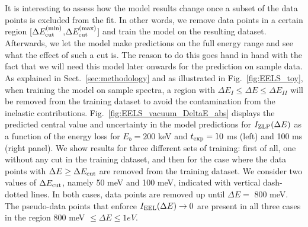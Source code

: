 It is interesting to assess how the model results change once a subset of the data points
is excluded from the fit.
%
In other words, we remove data points in a certain region 
[$\Delta E_{\rm cut}^{\rm (min)}$,$\Delta E_{\rm cut}^{\rm (max)}$]
and train the model on the resulting dataset. 
%
Afterwards, we let the model make predictions on the full energy range and see what the
effect of such a cut is. 
%
The reason to do this goes hand in hand with the fact that we will need this model later onwards
for the prediction on sample data. 
%
As explained in Sect.~\ref{sec:methodology} and as
illustrated in Fig.~\ref{fig:EELS_toy}, when training the model on sample spectra, a region
with $\Delta E_I \le \Delta E \le \Delta E_{II}$ will be removed from the training dataset to avoid the
contamination from the inelastic contributions.
%
Fig.~\ref{fig:EELS_vacuum_DeltaE_abs} displays
the predicted central value and uncertainty in the model predictions for $I_{\rm ZLP}(\Delta E)$
as a function of the energy loss for $E_b=200$ keV and $t_{\rm exp}=10$ ms (left)
and 100 ms (right panel).
%
We show results for three different sets of training: first of all, one without any cut
in the training dataset, and then for the case where the data points with $\Delta E \ge \Delta E_{\rm cut}$
are removed from the training dataset.
%
We consider two values of $\Delta E_{\rm cut}$, namely 50 meV and 100 meV, indicated
with vertical dash-dotted lines.
%
In both cases, data points are removed up until $\Delta E =$ 800 meV. The pseudo-data points 
that enforce $I_{\rm EEL}(\Delta E)\to 0$ are present
in all three cases in the region 800 meV $\le \Delta E \le 1 eV$. 

